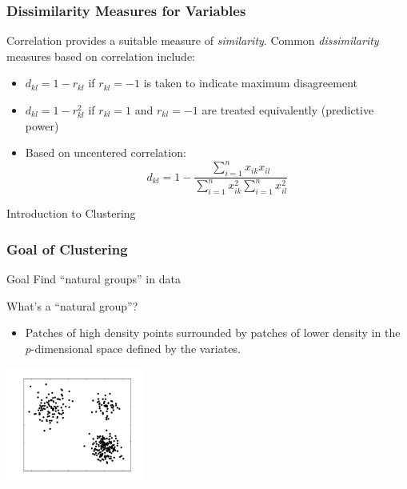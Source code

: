 \documentclass{beamer}
\begin{document}
\begin{frame}
  \frametitle{Dissimilarity Measures for Variables}

Correlation provides a suitable measure of \emph{similarity}. Common \emph{dissimilarity} measures based on correlation include:


\begin{itemize}

\item $d_{kl} = 1 - r_{kl}$ if $r_{kl} = -1$ is taken to indicate maximum disagreement

\item $d_{kl} = 1 - r_{kl}^2$ if $r_{kl} = 1$ and $r_{kl} = -1$ are treated equivalently (predictive power)


\item Based on uncentered correlation:
\[
d_{kl} = 1 - \frac{\sum_{i=1}^n x_{ik}x_{il}} {\sum_{i=1}^n x_{ik}^2 \sum_{i=1}^n x_{il}^2}
\]

\end{itemize}
\end{frame}

\begin{frame}[plain,c]
\begin{center}
\Huge Introduction to Clustering
\end{center}
\end{frame}

\begin{frame}
  \frametitle{Goal of Clustering}

\begin{block}{Goal}
Find ``natural groups'' in data
\end{block}

What's a ``natural group''?

\begin{itemize}
  \item Patches of high density points surrounded by patches of lower density in the $p$-dimensional space defined by the variates.
\end{itemize}

\begin{center}
\includegraphics[height=1.5in]{cluster-fig.pdf}
\end{center}

\end{frame}
\end{document}
